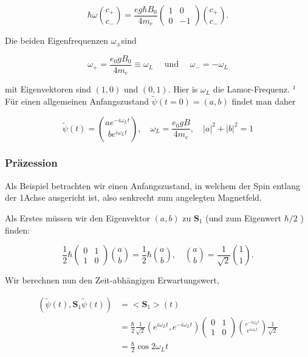 \documentclass[10pt, letterpaper]{article}
\begin{document}
$$
\hbar \omega\binom{c_{+}}{c_{-}}=\frac{e g \hbar B_{0}}{4 m_{e}}\left(\begin{array}{cc}
1 & 0 \\
0 & -1
\end{array}\right)\binom{c_{+}}{c_{-}} .
$$

Die beiden Eigenfrequenzen $\omega_{ \pm}$sind

$$
\omega_{+}=\frac{e_{0} g B_{0}}{4 m_{e}} \equiv \omega_{L} \quad \text { und } \quad \omega_{-}=-\omega_{L}
$$

mit Eigenvektoren sind $(1,0)$ und $(0,1)$. Hier is $\omega_{L}$ die Lamor-Frequenz. ${ }^{1}$ Für einen allgemeinen Anfangszustand $\tilde{\psi}(t=0)=(a, b)$ findet man daher

$$
\tilde{\psi}(t)=\binom{a e^{-i \omega_{L} t}}{b e^{i \omega_{L} t}}, \quad \omega_{L}=\frac{e_{0} g B}{4 m_{e}}, \quad|a|^{2}+|b|^{2}=1
$$

\subsubsection*{Präzession}
Als Beispiel betrachten wir einen Anfangszustand, in welchem der Spin entlang der 1Achse ausgericht ist, also senkrecht zum angelegten Magnetfeld.

Als Erstes müssen wir den Eigenvektor $(a, b)$ zu $\mathbf{S}_{1}$ (und zum Eigenwert $\hbar / 2$ ) finden:

$$
\frac{1}{2} \hbar\left(\begin{array}{ll}
0 & 1 \\
1 & 0
\end{array}\right)\binom{a}{b}=\frac{1}{2} \hbar\binom{a}{b}, \quad\binom{a}{b}=\frac{1}{\sqrt{2}}\binom{1}{1} .
$$

Wir berechnen nun den Zeit-abhängigen Erwartungswert,

$$
\begin{aligned}
\left(\tilde{\psi}(t), \mathbf{S}_{1} \tilde{\psi}(t)\right) & =<\mathbf{S}_{1}>(t) \\
& =\frac{\hbar}{2} \frac{1}{\sqrt{2}}\left(e^{i \omega_{L} t}, e^{-i \omega_{L} t}\right)\left(\begin{array}{cc}
0 & 1 \\
1 & 0
\end{array}\right)\binom{e^{-i \omega_{L} t}}{e^{i \omega_{L} t}} \frac{1}{\sqrt{2}} \\
& =\frac{\hbar}{2} \cos 2 \omega_{L} t
\end{aligned}
$$
\end{document}
